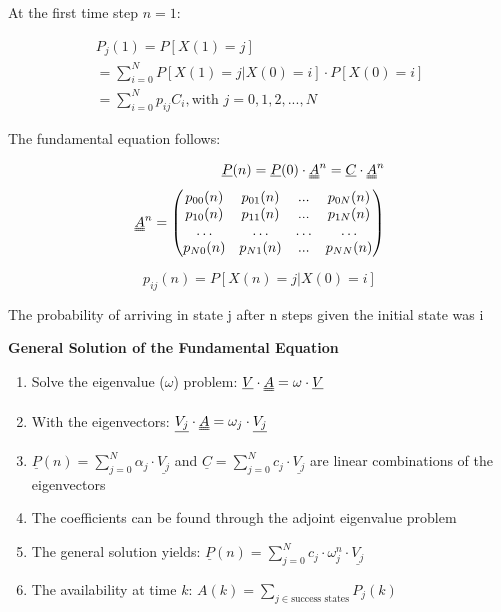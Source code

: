 \documentclass[8pt, landscape, fleqn]{scrartcl}
\begin{document}
\begin{multicols*}{3}
At the first time step $n=1$:

\begin{align}
    P_j(1) = P[X(1) = j] \\ = \sum_{i=0}^N P\left[X(1) = j | X(0) = i\right] \cdot P\left[ X(0)=i\right] \\ = \sum_{i=0}^N p_{ij} C_i, \text{with } j = 0,1,2,...,N
\end{align}

The fundamental equation follows:

\begin{align}
    \underline{P}(n) = \underline{P}(0) \cdot \uuline{A}^n = \underline{C} \cdot \uuline{A}^n \\
    \uuline{A}^n = \begin{pmatrix}
        p_{00}(n) & p_{01}(n) & ... & p_{0N}(n) \\
        p_{10}(n) & p_{11}(n) & ... & p_{1N}(n) \\
        \dots   & \dots & \dots & \dots \\
        p_{N0}(n) & p_{N1}(n) & ... & p_{NN}(n)
    \end{pmatrix}
\end{align}

\begin{equation}
    p_{ij}(n) = P[X(n) = j | X(0) = i]
\end{equation}

The probability of arriving in state j after n steps given the initial state was i \newline \newline

\textbf{General Solution of the Fundamental Equation}

\begin{enumerate}
    \item Solve the eigenvalue ($\omega$) problem: $\underline{V}\cdot \uuline{A} = \omega \cdot \underline{V}$
    \item With the eigenvectors: $\underline{V_j} \cdot \uuline{A} = \omega_j \cdot \underline{V_j}$ 
    \item $\underline{P}(n) = \sum_{j=0}^N \alpha_j \cdot \underline{V_j}$ and $\underline{C} = \sum_{j=0}^N c_j \cdot \underline{V_j}$ are linear combinations of the eigenvectors
    \item The coefficients can be found through the adjoint eigenvalue problem
    \item The general solution yields: $\underline{P}(n) = \sum_{j=0}^{N} c_j\cdot \omega_j^n \cdot \underline{V_j} $
    \item The availability at time $k$: $A(k) = \sum_{j \in \text{success states}} P_j(k)$
\end{enumerate}


\end{multicols*}
\end{document}
